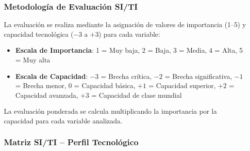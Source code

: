 \subsubsection{Metodología de Evaluación SI/TI}

La evaluación se realiza mediante la asignación de valores de importancia (1--5) y capacidad tecnológica ($-3$ a $+3$) para cada variable:

\begin{itemize}
\item \textbf{Escala de Importancia}: 1 = Muy baja, 2 = Baja, 3 = Media, 4 = Alta, 5 = Muy alta
\item \textbf{Escala de Capacidad}: $-3$ = Brecha crítica, $-2$ = Brecha significativa, $-1$ = Brecha menor, 0 = Capacidad básica, $+1$ = Capacidad superior, $+2$ = Capacidad avanzada, $+3$ = Capacidad de clase mundial
\end{itemize}

La evaluación ponderada se calcula multiplicando la importancia por la capacidad para cada variable analizada.

\subsubsection{Matriz SI/TI -- Perfil Tecnológico}


